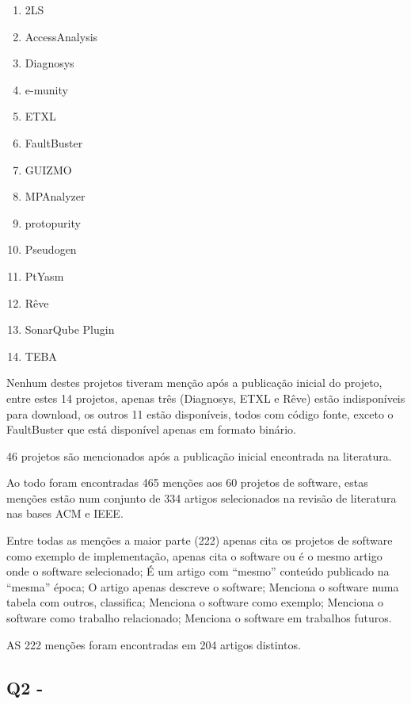 \begin{enumerate}
  \item 2LS
  \item AccessAnalysis
  \item Diagnosys
  \item e-munity
  \item ETXL
  \item FaultBuster
  \item GUIZMO
  \item MPAnalyzer
  \item protopurity
  \item Pseudogen
  \item PtYasm
  \item Rêve
  \item SonarQube Plugin
  \item TEBA
\end{enumerate}

Nenhum destes projetos tiveram menção após a publicação inicial do projeto,
entre estes 14 projetos, apenas três (Diagnosys, ETXL e Rêve) estão
indisponíveis para download, os outros 11 estão disponíveis, todos com código
fonte, exceto o FaultBuster que está disponível apenas em formato binário.

46 projetos são mencionados após a publicação inicial encontrada na literatura.

Ao todo foram encontradas 465 menções aos 60 projetos de software, estas
menções estão num conjunto de 334 artigos selecionados na revisão de literatura
nas bases ACM e IEEE.



Entre todas as menções a maior parte (222) apenas cita os projetos de software
como exemplo de implementação, apenas cita o software ou é o mesmo artigo onde
o software selecionado; É um artigo com “mesmo” conteúdo publicado na “mesma”
época; O artigo apenas descreve o software; Menciona o software numa tabela com
outros, classifica; Menciona o software como exemplo; Menciona o software como
trabalho relacionado; Menciona o software em trabalhos futuros.


AS 222 menções foram encontradas em 204 artigos distintos.

\subsection{Q2 - \EstudoDoisQuestaoDois}

